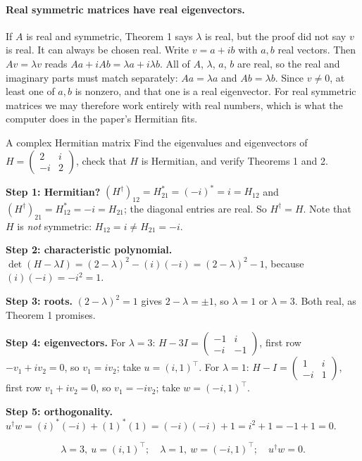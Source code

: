 \paragraph{Real symmetric matrices have real eigenvectors.} If $A$ is real and symmetric, Theorem 1 says $\lambda$ is real, but the proof did not say $v$ is real. It can always be chosen real. Write $v=a+ib$ with $a,b$ real vectors. Then $Av=\lambda v$ reads $Aa+iAb=\lambda a+i\lambda b$. All of $A$, $\lambda$, $a$, $b$ are real, so the real and imaginary parts must match separately: $Aa=\lambda a$ and $Ab=\lambda b$. Since $v\ne0$, at least one of $a,b$ is nonzero, and that one is a real eigenvector. For real symmetric matrices we may therefore work entirely with real numbers, which is what the computer does in the paper's Hermitian fits.

\begin{sample}{A complex Hermitian matrix}
Find the eigenvalues and eigenvectors of $H=\begin{pmatrix}2&i\\-i&2\end{pmatrix}$, check that $H$ is Hermitian, and verify Theorems 1 and 2.

\textbf{Step 1: Hermitian?} $(H^\dagger)_{12}=H_{21}^*=(-i)^*=i=H_{12}$ and $(H^\dagger)_{21}=H_{12}^*=-i=H_{21}$; the diagonal entries are real. So $H^\dagger=H$. Note that $H$ is \emph{not} symmetric: $H_{12}=i\ne H_{21}=-i$.

\textbf{Step 2: characteristic polynomial.} $\det(H-\lambda I)=(2-\lambda)^2-(i)(-i)=(2-\lambda)^2-1$, because $(i)(-i)=-i^2=1$.

\textbf{Step 3: roots.} $(2-\lambda)^2=1$ gives $2-\lambda=\pm1$, so $\lambda=1$ or $\lambda=3$. Both real, as Theorem 1 promises.

\textbf{Step 4: eigenvectors.} For $\lambda=3$: $H-3I=\begin{pmatrix}-1&i\\-i&-1\end{pmatrix}$, first row $-v_1+iv_2=0$, so $v_1=iv_2$; take $u=(i,1)^\top$. For $\lambda=1$: $H-I=\begin{pmatrix}1&i\\-i&1\end{pmatrix}$, first row $v_1+iv_2=0$, so $v_1=-iv_2$; take $w=(-i,1)^\top$.

\textbf{Step 5: orthogonality.} $u^\dagger w=(i)^*(-i)+(1)^*(1)=(-i)(-i)+1=i^2+1=-1+1=0$.

\[
\boxed{\lambda=3,\ u=(i,1)^\top;\quad\lambda=1,\ w=(-i,1)^\top;\quad u^\dagger w=0.}
\]
\end{sample}

